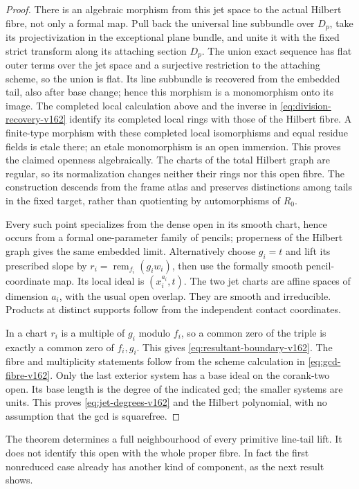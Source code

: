 \documentclass[11pt,reqno]{amsart}
\numberwithin{equation}{section}
\theoremstyle{definition}\newtheorem{definition}[theorem]{Definition}
\theoremstyle{remark}\newtheorem{remark}[theorem]{Remark}
\begin{document}
\begin{proof}
There is an algebraic morphism from this jet space to the actual
Hilbert fibre, not only a formal map. Pull back the universal line
subbundle over $D_p$, take its projectivization in the exceptional
plane bundle, and unite it with the fixed strict transform along
its attaching section $D_p$. The union exact sequence has flat
outer terms over the jet space and a surjective restriction to the
attaching scheme, so the union is flat. Its line subbundle is
recovered from the embedded tail, also after base change; hence this
morphism is a monomorphism onto its image. The completed local
calculation above and the inverse in
\eqref{eq:division-recovery-v162} identify its completed local rings
with those of the Hilbert fibre. A finite-type morphism with these
completed local isomorphisms and equal residue fields is etale there;
an etale monomorphism is an open immersion. This proves the claimed
openness algebraically. The charts of the total Hilbert graph are
regular, so its normalization changes neither their rings nor this
open fibre. The construction descends from the frame atlas and
preserves distinctions among tails in the fixed target, rather than
quotienting by automorphisms of $R_0$.

Every such point specializes from the dense open in its smooth
chart, hence occurs from a formal one-parameter family of pencils;
properness of the Hilbert graph gives the same embedded limit.
Alternatively choose $g_i=t$ and lift its prescribed slope by
$r_i=\operatorname{rem}_{f_i}(g_iw_i)$, then use the formally smooth
pencil-coordinate map. Its local ideal is $(x_i^{a_i},t)$.
The two jet charts are affine spaces of dimension $a_i$, with the
usual open overlap. They are smooth and irreducible. Products at
distinct supports follow from the independent contact coordinates.

In a chart $r_i$ is a multiple of $g_i$ modulo $f_i$, so a common
zero of the triple is exactly a common zero of $f_i,g_i$. This gives
\eqref{eq:resultant-boundary-v162}. The fibre and multiplicity
statements follow from the scheme calculation in
\eqref{eq:gcd-fibre-v162}. Only the last exterior system has a base
ideal on the corank-two open. Its base length is the degree of the
indicated gcd; the smaller systems are units. This proves
\eqref{eq:jet-degrees-v162} and the Hilbert polynomial, with no
assumption that the gcd is squarefree.
\end{proof}

The theorem determines a full neighbourhood of every primitive
line-tail lift. It does not identify this open with the whole
proper fibre. In fact the first nonreduced case already has another
kind of component, as the next result shows.
\end{document}
